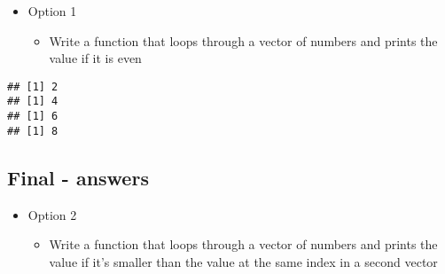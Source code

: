 \documentclass[]{article}
\newenvironment{Shaded}{\begin{snugshade}}{\end{snugshade}}
\newcommand{\KeywordTok}[1]{\textcolor[rgb]{0.13,0.29,0.53}{\textbf{#1}}}
\newcommand{\DataTypeTok}[1]{\textcolor[rgb]{0.13,0.29,0.53}{#1}}
\newcommand{\DecValTok}[1]{\textcolor[rgb]{0.00,0.00,0.81}{#1}}
\newcommand{\StringTok}[1]{\textcolor[rgb]{0.31,0.60,0.02}{#1}}
\newcommand{\ControlFlowTok}[1]{\textcolor[rgb]{0.13,0.29,0.53}{\textbf{#1}}}
\newcommand{\OperatorTok}[1]{\textcolor[rgb]{0.81,0.36,0.00}{\textbf{#1}}}
\newcommand{\NormalTok}[1]{#1}
\providecommand{\tightlist}{%
  \setlength{\itemsep}{0pt}\setlength{\parskip}{0pt}}
\begin{document}
\begin{itemize}
\tightlist
\item
  Option 1

  \begin{itemize}
  \tightlist
  \item
    Write a function that loops through a vector of numbers and prints
    the value if it is even
  \end{itemize}
\end{itemize}

\begin{Shaded}
\end{Shaded}

\begin{verbatim}
## [1] 2
## [1] 4
## [1] 6
## [1] 8
\end{verbatim}

\subsection{Final - answers}\label{final---answers-1}

\begin{itemize}
\tightlist
\item
  Option 2

  \begin{itemize}
  \tightlist
  \item
    Write a function that loops through a vector of numbers and prints
    the value if it's smaller than the value at the same index in a
    second vector
  \end{itemize}
\end{itemize}
\end{document}
